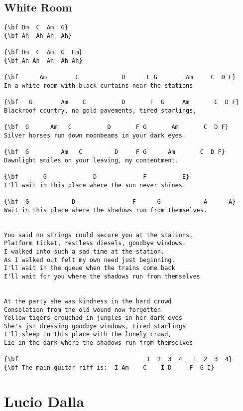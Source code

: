 \documentclass[a4paper]{article}
\begin{document}
\subsection{White Room} %
\label{sub:White Room}
\begin{Verbatim}[commandchars=\\\{\}]
{\bf Dm  C  Am  G}
{\bf Ah  Ah Ah  Ah}

{\bf Dm  C  Am  G  Em}
{\bf Ah Ah  Ah  Ah Ah}

{\bf      Am        C            D      F G        Am     C  D F}
In a white room with black curtains near the stations

{\bf   G        Am    C          D       F  G     Am       C  D F}
Blackroof country, no gold pavements, tired starlings,

{\bf  G      Am   C          D       F G       Am       C  D F}
Silver horses run down moonbeams in your dark eyes.

{\bf  G         Am   C         D     F G      Am       C  D F}
Dawnlight smiles on your leaving, my contentment.

{\bf       G             D             F          E}
I'll wait in this place where the sun never shines.

{\bf  G            D                F      G            A      A}
Wait in this place where the shadows run from themselves.


You said no strings could secure you at the stations.
Platform ticket, restless diesels, goodbye windows.
I walked into such a sad time at the station.
As I walked out felt my own need just beginning.
I'll wait in the queue when the trains come back
I'll wait for you where the shadows run from themselves


At the party she was kindness in the hard crowd
Consolation from the old wound now forgotten
Yellow tigers crouched in jungles in her dark eyes
She's jst dressing goodbye windows, tired starlings
I'll sleep in this place with the lonely crowd,
Lie in the dark where the shadows run from themselves

{\bf                                    1  2  3  4   1  2  3  4}
{\bf The main guitar riff is:  I Am    C    I D     F  G I}
\end{Verbatim}
\newpage
\section{Lucio Dalla} %
\label{sec:Lucio Dall}
\end{document}
